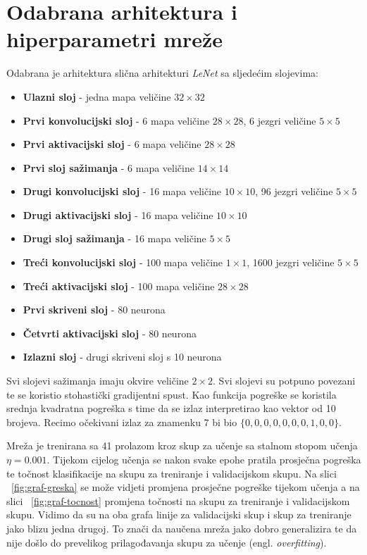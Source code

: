 \documentclass[times, utf8, zavrsni, numeric]{fer}
\begin{document}
\section{Odabrana arhitektura i hiperparametri mreže}
Odabrana je arhitektura slična arhitekturi \textit{LeNet} \citep{lecun1995convolutional} sa sljedećim slojevima:
\begin{itemize}
\item \textbf{Ulazni sloj} - jedna mapa veličine $32 \times 32$
\item \textbf{Prvi konvolucijski sloj} - 6 mapa veličine $28 \times 28$, 6 jezgri veličine $5 \times 5$
\item \textbf{Prvi aktivacijski sloj} - 6 mapa veličine $28 \times 28$
\item \textbf{Prvi sloj sažimanja} - 6 mapa veličine $14 \times 14$
\item \textbf{Drugi konvolucijski sloj} - 16 mapa veličine $10 \times 10$, 96 jezgri veličine $5 \times 5$
\item \textbf{Drugi aktivacijski sloj} - 16 mapa veličine $10 \times 10$
\item \textbf{Drugi sloj sažimanja} - 16 mapa veličine $5 \times 5$
\item \textbf{Treći konvolucijski sloj} - 100 mapa veličine $1 \times 1$, 1600 jezgri veličine $5 \times 5$
\item \textbf{Treći aktivacijski sloj} - 100 mapa veličine $28 \times 28$
\item \textbf{Prvi skriveni sloj} - 80 neurona
\item \textbf{Četvrti aktivacijski sloj} - 80 neurona
\item \textbf{Izlazni sloj} - drugi skriveni sloj s 10 neurona
\end{itemize}

Svi slojevi sažimanja imaju okvire veličine $2 \times 2$. Svi slojevi su potpuno povezani te se koristio stohastički gradijentni spust. Kao funkcija pogreške se koristila srednja kvadratna pogreška s time da se izlaz interpretirao kao vektor od 10 brojeva. Recimo očekivani izlaz za znamenku 7 bi bio $\{0,0,0,0,0,0,0,1,0,0\}$.

Mreža je trenirana sa 41 prolazom kroz skup za učenje sa stalnom stopom učenja $\eta=0.001$. Tijekom cijelog učenja se nakon svake epohe pratila prosječna pogreška te točnost klasifikacije na skupu za treniranje i validacijskom skupu. Na slici ~\ref{fig:graf-greska} se može vidjeti promjena prosječne pogreške tijekom učenja a na slici ~\ref{fig:graf-tocnost} promjena točnosti na skupu za treniranje i validacijskom skupu. Vidimo da su na oba grafa linije za validacijski skup i skup za treniranje jako blizu jedna drugoj. To znači da naučena mreža jako dobro generalizira te da nije došlo do prevelikog prilagođavanja skupu za učenje (engl. \textit{overfitting}).
\end{document}
